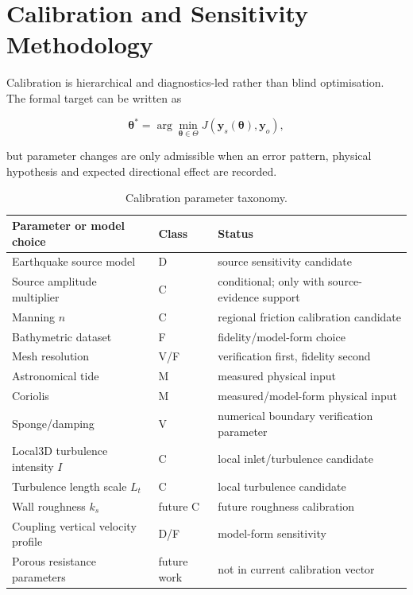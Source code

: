 \section{Calibration and Sensitivity Methodology}

Calibration is hierarchical and diagnostics-led rather than blind optimisation. The formal target can be written as

\begin{equation}
\label{eq:calibration-optimisation-target}
\boldsymbol{\theta}^{*}
=
\arg\min_{\boldsymbol{\theta}\in\Theta}
J
\left(
\mathbf y_s(\boldsymbol{\theta}),
\mathbf y_o
\right),
\end{equation}

but parameter changes are only admissible when an error pattern, physical hypothesis and expected directional effect are recorded.

\begin{table}[H]
\centering
\caption{Calibration parameter taxonomy.}
\label{tab:calibration-taxonomy}
\begin{tabularx}{\textwidth}{p{}p{}X}
\toprule
Parameter or model choice & Class & Status \\
\midrule
Earthquake source model & D & source sensitivity candidate \\
Source amplitude multiplier & C & conditional; only with source-evidence support \\
Manning \(n\) & C & regional friction calibration candidate \\
Bathymetric dataset & F & fidelity/model-form choice \\
Mesh resolution & V/F & verification first, fidelity second \\
Astronomical tide & M & measured physical input \\
Coriolis & M & measured/model-form physical input \\
Sponge/damping & V & numerical boundary verification parameter \\
Local3D turbulence intensity \(I\) & C & local inlet/turbulence candidate \\
Turbulence length scale \(L_t\) & C & local turbulence candidate \\
Wall roughness \(k_s\) & future C & future roughness calibration \\
Coupling vertical velocity profile & D/F & model-form sensitivity \\
Porous resistance parameters & future work & not in current calibration vector \\
\bottomrule
\end{tabularx}
\end{table}

